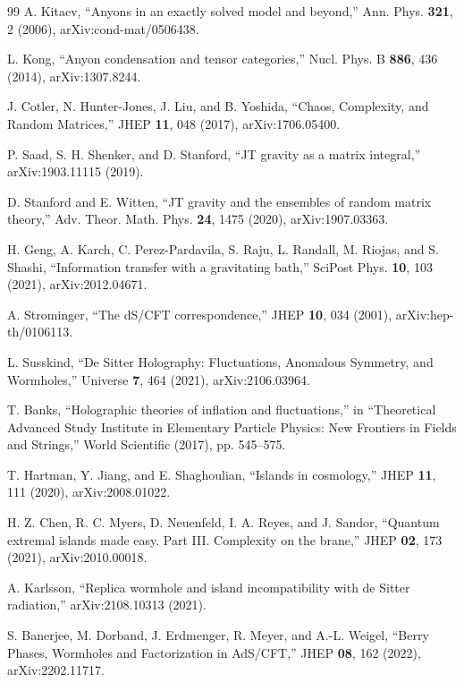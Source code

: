 \documentclass[12pt,a4paper]{article}
\begin{document}
\begin{thebibliography}{99}
A. Kitaev, ``Anyons in an exactly solved model and beyond,'' Ann. Phys. \textbf{321}, 2 (2006), arXiv:cond-mat/0506438.

L. Kong, ``Anyon condensation and tensor categories,'' Nucl. Phys. B \textbf{886}, 436 (2014), arXiv:1307.8244.

J. Cotler, N. Hunter-Jones, J. Liu, and B. Yoshida, ``Chaos, Complexity, and Random Matrices,'' JHEP \textbf{11}, 048 (2017), arXiv:1706.05400.

P. Saad, S. H. Shenker, and D. Stanford, ``JT gravity as a matrix integral,'' arXiv:1903.11115 (2019).

D. Stanford and E. Witten, ``JT gravity and the ensembles of random matrix theory,'' Adv. Theor. Math. Phys. \textbf{24}, 1475 (2020), arXiv:1907.03363.

H. Geng, A. Karch, C. Perez-Pardavila, S. Raju, L. Randall, M. Riojas, and S. Shashi, ``Information transfer with a gravitating bath,'' SciPost Phys. \textbf{10}, 103 (2021), arXiv:2012.04671.

A. Strominger, ``The dS/CFT correspondence,'' JHEP \textbf{10}, 034 (2001), arXiv:hep-th/0106113.

L. Susskind, ``De Sitter Holography: Fluctuations, Anomalous Symmetry, and Wormholes,'' Universe \textbf{7}, 464 (2021), arXiv:2106.03964.

T. Banks, ``Holographic theories of inflation and fluctuations,'' in ``Theoretical Advanced Study Institute in Elementary Particle Physics: New Frontiers in Fields and Strings,'' World Scientific (2017), pp. 545--575.

T. Hartman, Y. Jiang, and E. Shaghoulian, ``Islands in cosmology,'' JHEP \textbf{11}, 111 (2020), arXiv:2008.01022.

H. Z. Chen, R. C. Myers, D. Neuenfeld, I. A. Reyes, and J. Sandor, ``Quantum extremal islands made easy. Part III. Complexity on the brane,'' JHEP \textbf{02}, 173 (2021), arXiv:2010.00018.

A. Karlsson, ``Replica wormhole and island incompatibility with de Sitter radiation,'' arXiv:2108.10313 (2021).

S. Banerjee, M. Dorband, J. Erdmenger, R. Meyer, and A.-L. Weigel, ``Berry Phases, Wormholes and Factorization in AdS/CFT,'' JHEP \textbf{08}, 162 (2022), arXiv:2202.11717.


\end{thebibliography}
\end{document}
